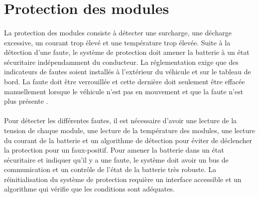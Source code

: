 \section{Protection des modules}
	\paragraph*{}
	La protection des modules consiste à détecter une surcharge, une décharge excessive, un courant trop élevé et une température trop élevée. Suite à la détection d'une faute, le système de protection doit amener la batterie à un état sécuritaire indépendamment du conducteur. La réglementation exige que des indicateurs de fautes soient installés à l'extérieur du véhicule et sur le tableau de bord. La faute doit être verrouillée et cette dernière doit seulement être effacée manuellement lorsque le véhicule n'est pas en mouvement et que la faute n'est plus présente \cite{cahier_charge}.
	
	\paragraph*{}
	Pour détecter les différentes fautes, il est nécessaire d'avoir une lecture de la tension de chaque module, une lecture de la température des modules, une lecture du courant de la batterie et un algorithme de détection pour éviter de déclencher la protection pour un faux-positif. Pour amener la batterie dans un état sécuritaire et indiquer qu'il y a une faute, le système doit avoir un bus de communication et un contrôle de l'état de la batterie très robuste. La réinitialisation du système de protection requière un interface accessible et un algorithme qui vérifie que les conditions sont adéquates. 
	
	
	